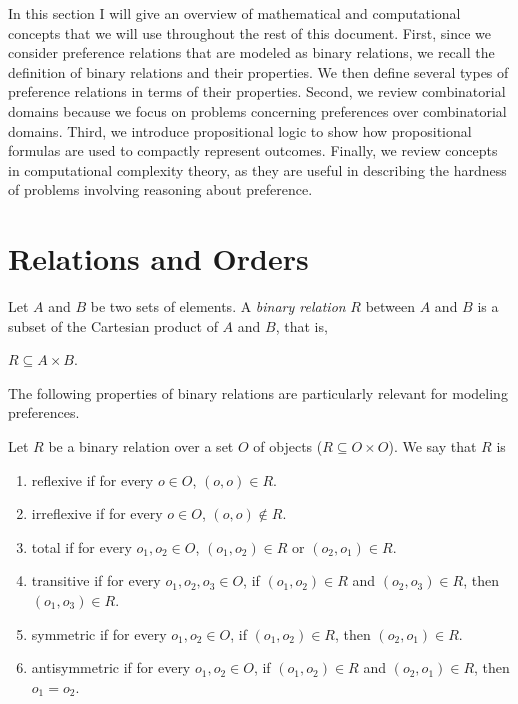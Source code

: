 
In this section I will give an overview of
mathematical and computational concepts
that we will use throughout the rest of this document. 
First, since we consider preference relations that are modeled
as binary relations,
we recall the definition of binary relations and their
properties.
We then define several types of preference relations in terms of
their properties.
Second, we review combinatorial domains because we focus on
problems concerning preferences over combinatorial domains.
Third, we introduce propositional logic to show how propositional
formulas are used to compactly represent outcomes.
Finally, we review concepts in computational complexity theory,
as they are useful in describing the hardness of problems
involving reasoning about preference.

\section{Relations and Orders \label{sec:relations}}


\begin{definition}
	Let $A$ and $B$ be two sets of elements.  A \textit{binary relation} $R$ between $A$ and $B$
	is a subset of the Cartesian product of $A$ and $B$, that is,
	\begin{center}
		$R \subseteq A \times B$.
	\end{center}
\end{definition}


The following properties of binary relations are particularly relevant for modeling preferences.
\begin{definition}
	Let $R$ be a binary relation over a set $O$ of objects ($R \subseteq O \times O$).
	We say that $R$ is
	\begin{enumerate} \itemsep -4pt
		\item reflexive if for every $o \in O$, $(o,o) \in R$.
		\item irreflexive if for every $o \in O$, $(o,o) \not \in R$.
		\item total if for every $o_1,o_2 \in O$, $(o_1,o_2) \in R$ or $(o_2,o_1) \in R$.
		\item transitive if for every $o_1,o_2,o_3 \in O$, if $(o_1,o_2) \in R$ and $(o_2,o_3) \in R$, 
					then $(o_1,o_3) \in R$.
		\item symmetric if for every $o_1,o_2 \in O$, if $(o_1,o_2) \in R$, then $(o_2,o_1) \in R$.
		\item antisymmetric if for every $o_1,o_2 \in O$, if $(o_1,o_2) \in R$ and $(o_2,o_1) \in R$, then $o_1=o_2$.
	\end{enumerate}
\end{definition}

